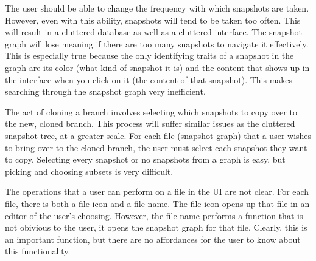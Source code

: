 The user should be able to change the frequency with which snapshots are taken. However, even with this ability, snapshots will tend to be taken too often. This will result in a cluttered database as well as a cluttered interface. The snapshot graph will lose meaning if there are too many snapshots to navigate it effectively. This is especially true because the only identifying traits of a snapshot in the graph are its color (what kind of snapshot it is) and the content that shows up in the interface when you click on it (the content of that snapshot). This makes searching through the snapshot graph very inefficient.


The act of cloning a branch involves selecting which snapshots to copy over to the new, cloned branch. This process will suffer similar issues as the cluttered snapshot tree, at a greater scale. For each file (snapshot graph) that a user wishes to bring over to the cloned branch, the user must select each snapshot they want to copy. Selecting every snapshot or no snapshots from a graph is easy, but picking and choosing subsets is very difficult.


The operations that a user can perform on a file in the UI are not clear. For each file, there is both a file icon and a file name. The file icon opens up that file in an editor of the user's choosing. However, the file name performs a function that is not obivious to the user, it opens the snapshot graph for that file. Clearly, this is an important function, but there are no affordances for the user to know about this functionality.

